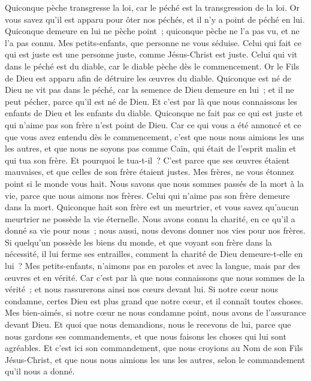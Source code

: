 \begin{multicols}{2}
Quiconque pèche transgresse la loi, car le péché est la transgression de la loi.
Or vous savez qu'il est apparu pour ôter nos péchés, et il n'y a point de péché en lui.
Quiconque demeure en lui ne pèche point~; quiconque pèche ne l'a pas vu, et ne l'a pas connu.
Mes petits-enfants, que personne ne vous séduise. Celui qui fait ce qui est juste est une personne juste, comme Jésus-Christ est juste.
Celui qui vit dans le péché est du diable, car le diable pèche dès le commencement. Or le Fils de Dieu est apparu afin de détruire les œuvres du diable.
Quiconque est né de Dieu ne vit pas dans le péché, car la semence de Dieu demeure en lui~; et il ne peut pécher, parce qu'il est né de Dieu.
Et c'est par là que nous connaissons les enfants de Dieu et les enfants du diable. Quiconque ne fait pas ce qui est juste et qui n'aime pas son frère n'est point de Dieu.
Car ce qui vous a été annoncé et ce que vous avez entendu dès le commencement, c'est que nous nous aimions les uns les autres,
et que nous ne soyons pas comme Caïn, qui était de l'esprit malin et qui tua son frère. Et pourquoi le tua-t-il~? C'est parce que ses œuvres étaient mauvaises, et que celles de son frère étaient justes.
Mes frères, ne vous étonnez point si le monde vous hait.
Nous savons que nous sommes passés de la mort à la vie, parce que nous aimons nos frères. Celui qui n'aime pas son frère demeure dans la mort.
Quiconque hait son frère est un meurtrier, et vous savez qu'aucun meurtrier ne possède la vie éternelle.
Nous avons connu la charité, en ce qu'il a donné sa vie pour nous~; nous aussi, nous devons donner nos vies pour nos frères.
Si quelqu'un possède les biens du monde, et que voyant son frère dans la nécessité, il lui ferme ses entrailles, comment la charité de Dieu demeure-t-elle en lui~?
Mes petits-enfants, n'aimons pas en paroles et avec la langue, mais par des œuvres et en vérité.
Car c'est par là que nous connaissons que nous sommes de la vérité~; et nous rassurerons ainsi nos cœurs devant lui.
Si notre cœur nous condamne, certes Dieu est plus grand que notre cœur, et il connaît toutes choses.
Mes bien-aimés, si notre cœur ne nous condamne point, nous avons de l'assurance devant Dieu.
Et quoi que nous demandions, nous le recevons de lui, parce que nous gardons ses commandements, et que nous faisons les choses qui lui sont agréables.
Et c'est ici son commandement, que nous croyions au Nom de son Fils Jésus-Christ, et que nous nous aimions les uns les autres, selon le commandement qu'il nous a donné.

\end{multicols}
